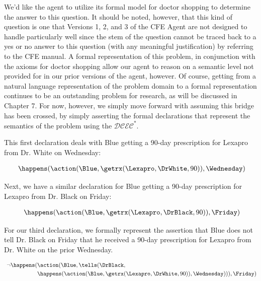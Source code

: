 We'd like the agent to utilize its formal model for doctor shopping to determine the answer to this question.  It should be noted, however, that this kind of question is one that Versions 1, 2, and 3 of the CFE Agent are not designed to handle particularly well since the stem of the question cannot be traced back to a yes or no answer to this question (with any meaningful justification) by referring to the CFE manual.  A formal representation of this problem, in conjunction with the axioms for doctor shopping allow our agent to reason on a semantic level not provided for in our prior versions of the agent, however.  Of course, getting from a natural language representation of the problem domain to a formal representation continues to be an outstanding problem for research, as will be discussed in Chapter 7.  For now, however, we simply move forward with assuming this bridge has been crossed, by simply asserting the formal declarations that represent the semantics of the problem using the $\mathcal{DCEC}^\ast$.

This first declaration deals with Blue getting a 90-day prescription for Lexapro from Dr. White on Wednesday: 

\begin{footnotesize}
\begin{align*}
[D1] \ \happens(\action(\Blue,\getrx(\Lexapro,\DrWhite,90)),\Wednesday)
\end{align*}
\end{footnotesize}

\noindent Next, we have a similar declaration for Blue getting a 90-day prescription for Lexapro from Dr. Black on Friday:
\begin{footnotesize}
\begin{align*}
[D2] \ \happens(\action(\Blue,\getrx(\Lexapro,\DrBlack,90)),\Friday)
\end{align*}
\end{footnotesize}

\noindent For our third declaration, we formally represent the assertion that Blue does not tell Dr. Black on Friday that he received a 90-day prescription for Lexapro from Dr. White on the prior Wednesday.
\begin{footnotesize}
\begin{align*}
[D3] \ \neg\happens(&\action(\Blue,\tells(\DrBlack, \\
	& \happens(\action(\Blue,\getrx(\Lexapro,\DrWhite,90)),\Wednesday))),\Friday)
\end{align*}
\end{footnotesize}

